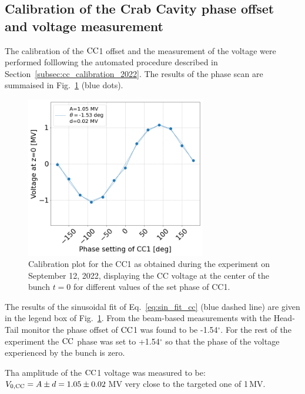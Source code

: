 \subsection{Calibration of the Crab Cavity phase offset and voltage measurement}\label{subsec:cc_calibration_2022_exp3}
The calibration of the ${\mathrm{CC}}$1 offset and the measurement of the voltage were performed folllowing the automated procedure described in Section~\ref{subsec:cc_calibration_2022}. The results of the phase scan are summaised in Fig.~\ref{fig:Vcc_calibration_md_sep2022} (blue dots).

\begin{figure}[!h] %
   \centering         
   \includegraphics[width=0.7\textwidth]{images/Ch8/Vcc_at_z_zero_vs_inspector_phase_CC1_for_thesis_new_xlabel_sep22.png}
       \caption{Calibration plot for the CC1 as obtained during the experiment on September 12, 2022, displaying the CC voltage at the center of the bunch $t=0$ for different values of the set phase of CC1.}
       \label{fig:Vcc_calibration_md_sep2022}
\end{figure}

The results of the sinusoidal fit of Eq.~\eqref{eq:sin_fit_cc} (blue dashed line) are given in the legend box of Fig.~\ref{fig:Vcc_calibration_md_sep2022}. From the beam-based measurements with the Head-Tail monitor the phase offset of ${\mathrm{CC}}$1 was found to be -1.54$^\circ$. For the rest of the experiment the ${\mathrm{CC}}$ phase was set to +1.54$^\circ$ so that the phase of the voltage experienced by the bunch is zero. 

Tha amplitude of the ${\mathrm{CC}}$1 voltage was measured to be: ${V_\mathrm{0, CC}}=A \pm d = 1.05 \pm 0.02$\,MV very close to the targeted one of 1\,MV.

